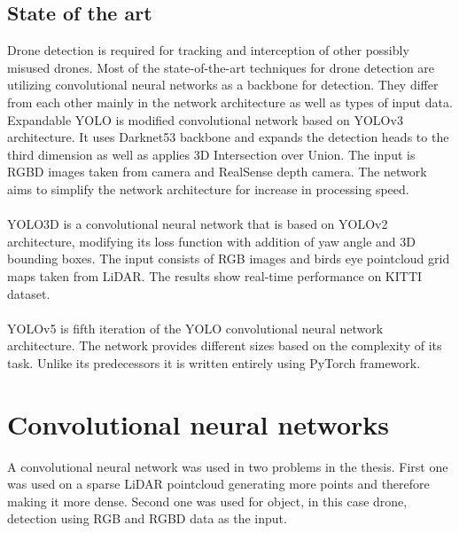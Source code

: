\documentclass[twoside]{ctuthesis}
\theoremstyle{plain}
\theoremstyle{definition}
\theoremstyle{note}
\begin{document}
\section{State of the art}
Drone detection is required for tracking and interception of other possibly misused drones. Most of the state-of-the-art techniques for drone detection are utilizing convolutional neural networks as a backbone for detection. They differ from each other mainly in the network architecture as well as types of input data. \newline
\newline
Expandable YOLO is modified convolutional network based on YOLOv3 architecture. It uses Darknet53 backbone and expands the detection heads to the third dimension as well as applies 3D Intersection over Union. The input is RGBD images taken from camera and RealSense depth camera. The network aims to simplify the network architecture for increase in processing speed.\\
\\
YOLO3D is a convolutional neural network that is based on YOLOv2 architecture, modifying its loss function with addition of yaw angle and 3D bounding boxes. The input consists of RGB images and birds eye pointcloud grid maps taken from LiDAR. The results show real-time performance on KITTI dataset.\\
\\
YOLOv5 is fifth iteration of the YOLO convolutional neural network architecture. The network provides different sizes based on the complexity of its task. Unlike its predecessors it is written entirely using PyTorch framework. 
\chapter{Convolutional neural networks}
A convolutional neural network was used in two problems in the thesis. First one was used on a sparse LiDAR pointcloud generating more points and therefore making it more dense. Second one was used for object, in this case drone, detection using RGB and RGBD data as the input.
\end{document}
